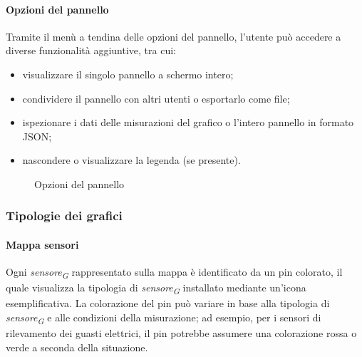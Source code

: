 \paragraph{Opzioni del pannello}
Tramite il menù a tendina delle opzioni del pannello, l'utente può accedere a diverse funzionalità aggiuntive, tra cui:
\begin{itemize}
    \item visualizzare il singolo pannello a schermo intero;
    \item condividere il pannello con altri utenti o esportarlo come file;
    \item ispezionare i dati delle misurazioni del grafico o l'intero pannello in formato JSON;
    \item nascondere o visualizzare la legenda (se presente).
\end{itemize}
\begin{figure}[H]
    \centering
    \caption{Opzioni del pannello}
    \label{fig:my_label}
\end{figure}


\subsubsection{Tipologie dei grafici}
\label{subsec:tipologie_grafici}

\paragraph{Mappa sensori}
\hypertarget{par:mappa_sensori}{}
Ogni \textit{sensore}\textsubscript{\textit{G}} rappresentato sulla mappa è identificato da un pin colorato, il quale visualizza la tipologia di \textit{sensore}\textsubscript{\textit{G}} installato mediante un'icona esemplificativa. La colorazione del pin può variare in base alla tipologia di \textit{sensore}\textsubscript{\textit{G}} e alle condizioni della misurazione; ad esempio, per i sensori di rilevamento dei guasti elettrici, il pin potrebbe assumere una colorazione rossa o verde a seconda della situazione.  

